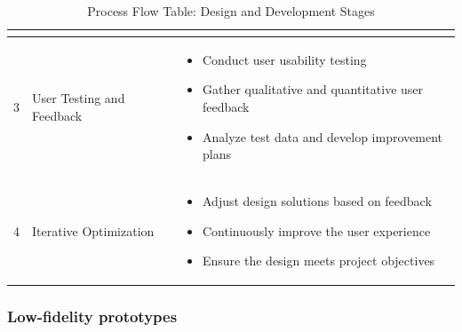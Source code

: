 \begin{table}[h!]
\begin{tabular}{|c|p{4cm}|p{10cm}|}
\begin{itemize}
                                                    \end{itemize}
                                                    \\ \hline
    3             & User Testing and Feedback & \begin{itemize}
                                                \item Conduct user usability
                                                testing
                                                \item Gather qualitative and
                                                quantitative user feedback
                                                \item Analyze test data and
                                            develop improvement plans
                                            \end{itemize}
                                            \\ \hline
    4             & Iterative Optimization       & \begin{itemize}
                                                    \item Adjust design
                                                    solutions based on feedback
                                                    \item Continuously improve
                                                    the user experience
                                                    \item Ensure the design
                                                meets project objectives
                                                \end{itemize}
                                                \\ \hline
    \end{tabular}
    \caption{Process Flow Table: Design and Development Stages}
    \label{tab:process_flow}
    \end{table}



\subsubsection{Low-fidelity prototypes}

